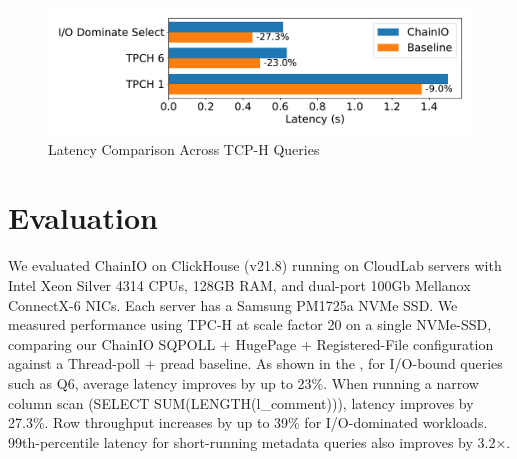\documentclass[sigconf,10pt]{acmart}
\newcommand{\sys}{ChainIO\xspace}
\begin{document}
\begin{figure}
\centering
\includegraphics[width=\columnwidth]{img/chainio.pdf}
\caption{Latency Comparison Across TCP-H Queries}\label{fig:experiment}
\end{figure}
\section{Evaluation}\label{sec:evaluation}

We evaluated \sys on ClickHouse (v21.8) running on CloudLab servers with Intel Xeon Silver 4314 CPUs, 128GB RAM, and dual-port 100Gb Mellanox ConnectX-6 NICs. Each server has a Samsung PM1725a NVMe SSD. We measured performance using TPC-H at scale factor 20 on a single NVMe-SSD, comparing our \sys SQPOLL + HugePage + Registered-File configuration against a Thread-poll + pread baseline. As shown in the , for I/O-bound queries such as Q6, average latency improves by up to 23\%. When running a narrow column scan (SELECT SUM(LENGTH(l\_comment))), latency improves by 27.3\%. Row throughput increases by up to 39\% for I/O-dominated workloads. 99th-percentile latency for short-running metadata queries also improves by 3.2×. %



\end{document}
